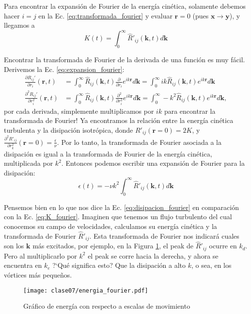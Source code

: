 Para encontrar la expansión de Fourier de la energía cinética, solamente debemos hacer $i=j$ en la Ec. \eqref{eq:transformada_fourier} y evaluar $\mathbf{r}=0$ (pues $\mathbf{x}\to\mathbf{y}$), y llegamos a
%
\begin{equation}\label{eq:K_fourier}
K(t) = \int_0^\infty \hat{R}'_{ij}(\mathbf{k},t)d\mathbf{k}
\end{equation}

Encontrar la transformada de Fourier de la derivada de una función es muy fácil. 
Derivemos la Ec. \eqref{eq:expansion_fourier}:
%
\begin{align}
\frac{\partial R_{ij}'}{\partial r_i}(\mathbf{r},t) &= \int_0^\infty \hat{R}_{ij}(\mathbf{k},t)\frac{\partial}{\partial r_i}e^{ik\mathbf{r}}d\mathbf{k} = \int_0^\infty ik\hat{R}_{ij}(\mathbf{k},t)e^{ik\mathbf{r}}d\mathbf{k}\nonumber\\
\frac{\partial^2 R_{ij}'}{\partial r_i^2}(\mathbf{r},t) &= \int_0^\infty \hat{R}_{ij}(\mathbf{k},t)\frac{\partial^2}{\partial r^2_i}e^{ik\mathbf{r}}d\mathbf{k} = \int_0^\infty -k^2\hat{R}_{ij}(\mathbf{k},t)e^{ik\mathbf{r}}d\mathbf{k},
\end{align}
%
por cada derivada, simplemente multiplicamos por $ik$ para encontrar la transformada de Fourier!
Ya encontramos la relación entre la energía cinética turbulenta y la disipación isotrópica, donde $R'_{ij}(\mathbf{r}=0) = 2K$, y $\frac{\partial^2 R'_{ij}}{\partial r_k^2}(\mathbf{r}=0) = \frac{\epsilon}{\nu}$.
Por lo tanto, la transformada de Fourier asociada a la disipación es igual a la transformada de Fourier de la energía cinética, multiplicada por $k^2$.
Entonces podemos escribir una expansión de Fourier para la disipación:
%
\begin{equation}\label{eq:disipacion_fourier}
\epsilon(t) = -\nu k^2 \int_0^\infty \hat{R}'_{ij}(\mathbf{k},t)d\mathbf{k}
\end{equation}

Pensemos bien en lo que nos dice la Ec. \eqref{eq:disipacion_fourier} en comparación con la Ec. \eqref{eq:K_fourier}.
Imaginen que tenemos un flujo turbulento del cual conocemos su campo de velocidades, calculamos su energía cinética y la transformada de Fourier $\hat{R}'_{ij}$.
Esta transformada de Fourier nos indicará cuales son los $\mathbf{k}$ más excitados, por ejemplo, en la Figura \ref{fig:energia_fourier}, el peak de $\hat{R}'_{ij}$ ocurre en $k_d$.
Pero al multiplicarlo por $k^2$ el peak se corre hacia la derecha, y ahora se encuentra en $k_e$
\mbox{?`}Qué significa esto? Que la disipación a alto $k$, o sea, en los vórtices más pequeños.
%
\begin{figure}[h!]
\centering
\texttt{[image: clase07/energia\_fourier.pdf]}
\caption{Gráfico de energía con respecto a escalas de movimiento}
\label{fig:energia_fourier}
\end{figure}

